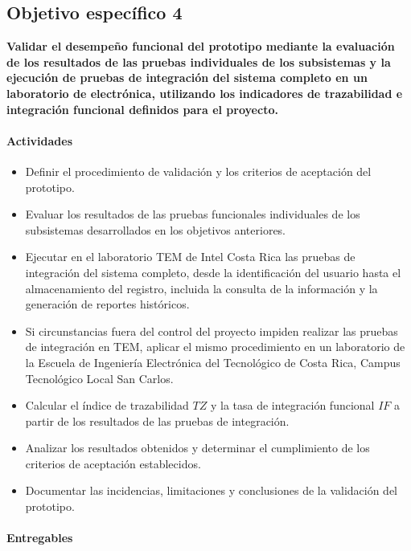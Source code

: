 \subsection{Objetivo específico 4}

\textbf{Validar el desempeño funcional del prototipo mediante la evaluación de
los resultados de las pruebas individuales de los subsistemas y la ejecución de
pruebas de integración del sistema completo en un laboratorio de electrónica,
utilizando los indicadores de trazabilidad e integración funcional definidos
para el proyecto.}

\paragraph{Actividades}

\begin{itemize}
\item Definir el procedimiento de validación y los criterios de aceptación del
prototipo.
\item Evaluar los resultados de las pruebas funcionales individuales de los
subsistemas desarrollados en los objetivos anteriores.
\item Ejecutar en el laboratorio TEM de Intel Costa Rica las pruebas de
integración del sistema completo, desde la identificación del usuario hasta el
almacenamiento del registro, incluida la consulta de la información y la
generación de reportes históricos.
\item Si circunstancias fuera del control del proyecto impiden realizar las
pruebas de integración en TEM, aplicar el mismo procedimiento en un laboratorio
de la Escuela de Ingeniería Electrónica del Tecnológico de Costa Rica, Campus
Tecnológico Local San Carlos.
\item Calcular el índice de trazabilidad \(TZ\) y la tasa de integración
funcional \(IF\) a partir de los resultados de las pruebas de integración.
\item Analizar los resultados obtenidos y determinar el cumplimiento de los
criterios de aceptación establecidos.
\item Documentar las incidencias, limitaciones y conclusiones de la validación
del prototipo.
\end{itemize}

\paragraph{Entregables}

